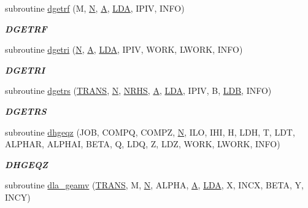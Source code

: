 \begin{DoxyCompactItemize}
subroutine \hyperlink{group__doubleGEcomputational_ga0019443faea08275ca60a734d0593e60}{dgetrf} (M, \hyperlink{polmisc_8c_a0240ac851181b84ac374872dc5434ee4}{N}, \hyperlink{classA}{A}, \hyperlink{example__user_8c_ae946da542ce0db94dced19b2ecefd1aa}{L\+D\+A}, I\+P\+I\+V, I\+N\+F\+O)
\begin{DoxyCompactList}\small\item\em {\bfseries D\+G\+E\+T\+R\+F} \end{DoxyCompactList}\item 
subroutine \hyperlink{group__doubleGEcomputational_ga56d9c860ce4ce42ded7f914fdb0683ff}{dgetri} (\hyperlink{polmisc_8c_a0240ac851181b84ac374872dc5434ee4}{N}, \hyperlink{classA}{A}, \hyperlink{example__user_8c_ae946da542ce0db94dced19b2ecefd1aa}{L\+D\+A}, I\+P\+I\+V, W\+O\+R\+K, L\+W\+O\+R\+K, I\+N\+F\+O)
\begin{DoxyCompactList}\small\item\em {\bfseries D\+G\+E\+T\+R\+I} \end{DoxyCompactList}\item 
subroutine \hyperlink{group__doubleGEcomputational_ga58e332cb1b8ab770270843221a48296d}{dgetrs} (\hyperlink{superlu__enum__consts_8h_a0c4e17b2d5cea33f9991ccc6a6678d62a1f61e3015bfe0f0c2c3fda4c5a0cdf58}{T\+R\+A\+N\+S}, \hyperlink{polmisc_8c_a0240ac851181b84ac374872dc5434ee4}{N}, \hyperlink{example__user_8c_aa0138da002ce2a90360df2f521eb3198}{N\+R\+H\+S}, \hyperlink{classA}{A}, \hyperlink{example__user_8c_ae946da542ce0db94dced19b2ecefd1aa}{L\+D\+A}, I\+P\+I\+V, B, \hyperlink{example__user_8c_a50e90a7104df172b5a89a06c47fcca04}{L\+D\+B}, I\+N\+F\+O)
\begin{DoxyCompactList}\small\item\em {\bfseries D\+G\+E\+T\+R\+S} \end{DoxyCompactList}\item 
subroutine \hyperlink{group__doubleGEcomputational_ga21c89aba210fbfb8cca635e47dccbdb3}{dhgeqz} (J\+O\+B, C\+O\+M\+P\+Q, C\+O\+M\+P\+Z, \hyperlink{polmisc_8c_a0240ac851181b84ac374872dc5434ee4}{N}, I\+L\+O, I\+H\+I, H, L\+D\+H, T, L\+D\+T, A\+L\+P\+H\+A\+R, A\+L\+P\+H\+A\+I, B\+E\+T\+A, Q, L\+D\+Q, Z, L\+D\+Z, W\+O\+R\+K, L\+W\+O\+R\+K, I\+N\+F\+O)
\begin{DoxyCompactList}\small\item\em {\bfseries D\+H\+G\+E\+Q\+Z} \end{DoxyCompactList}\item 
subroutine \hyperlink{group__doubleGEcomputational_gac150eadbadeb706cda2998e2bb0a70dd}{dla\+\_\+geamv} (\hyperlink{superlu__enum__consts_8h_a0c4e17b2d5cea33f9991ccc6a6678d62a1f61e3015bfe0f0c2c3fda4c5a0cdf58}{T\+R\+A\+N\+S}, M, \hyperlink{polmisc_8c_a0240ac851181b84ac374872dc5434ee4}{N}, A\+L\+P\+H\+A, \hyperlink{classA}{A}, \hyperlink{example__user_8c_ae946da542ce0db94dced19b2ecefd1aa}{L\+D\+A}, X, I\+N\+C\+X, B\+E\+T\+A, Y, I\+N\+C\+Y)

\end{DoxyCompactItemize}
